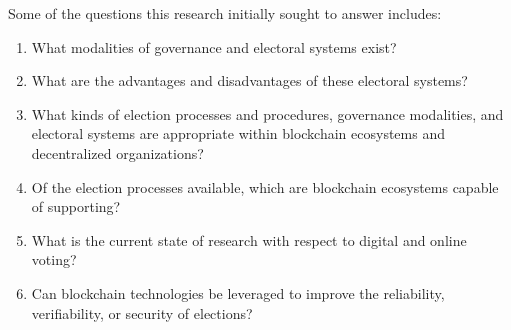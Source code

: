
Some of the questions this research initially sought to answer includes:

\begin{enumerate}
  \item What modalities of governance and electoral systems exist?

  \item What are the advantages and disadvantages of these electoral systems?

  \item What kinds of election processes and procedures, governance modalities,
    and electoral systems are appropriate within blockchain ecosystems and
    decentralized organizations?

  \item Of the election processes available, which are blockchain ecosystems
    capable of supporting?

  \item What is the current state of research with respect to digital and
   online voting?

  \item Can blockchain technologies be leveraged to improve the reliability,
    verifiability, or security of elections?
\end{enumerate}


%

